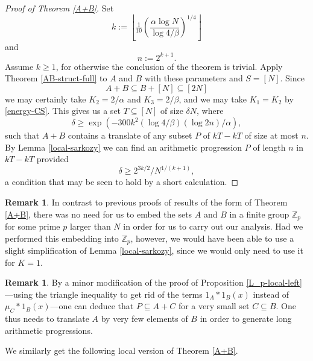 \documentclass[12pt,a4paper,reqno]{amsart}
\numberwithin{equation}{section}
\theoremstyle{plain}
\theoremstyle{definition}
\newtheorem{remark}[theorem]{Remark}
\renewcommand{\geq}{\geqslant}
\renewcommand{\subset}{\subseteq}
\def\Z{\mathbb{Z}}
\newcommand{\Zmod}[1]{\Z_#1} %
\begin{document}
\begin{proof}[Proof of Theorem \ref{A+B}]
Set 
\[ k := \left\lfloor \tfrac{1}{10} \left( \frac{\alpha \log{N}}{\log{4/\beta}} \right)^{1/4} \right\rfloor \]
and
\[ n := 2^{k+1}. \]
Assume $k \geq 1$, for otherwise the conclusion of the theorem is trivial. Apply Theorem \ref{AB-struct-full} to $A$ and $B$ with these parameters and $S = [N]$. Since 
\[ A+B \subset B + [N] \subset [2N] \]
we may certainly take $K_2 = 2/\alpha$ and $K_3 = 2/\beta$, and we may take $K_1 = K_2$ by \eqref{energy-CS}. This gives us a set $T \subset [N]$ of size $\delta N$, where
\[ \delta \geq \exp\left(-300 k^2 (\log{4/\beta}) (\log{2n}) /\alpha \right), \]
such that $A+B$ contains a translate of any subset $P$ of $kT-kT$ of size at most $n$. By Lemma \ref{local-sarkozy} we can find an arithmetic progression $P$ of length $n$ in $kT-kT$ provided 
\[ \delta \geq 2^{3k/2}/N^{1/(k+1)}, \]
a condition that may be seen to hold by a short calculation.
\end{proof}
\begin{remark}
In contrast to previous proofs of results of the form of Theorem \ref{A+B}, there was no need for us to embed the sets $A$ and $B$ in a finite group $\Zmod{p}$ for some prime $p$ larger than $N$ in order for us to carry out our analysis. Had we performed this embedding into $\Zmod{p}$, however, we would have been able to use a slight simplification of Lemma \ref{local-sarkozy}, since we would only need to use it for $K=1$.
\end{remark}
\begin{remark}
By a minor modification of the proof of Proposition \ref{L_p-local-left}---using the triangle inequality to get rid of the terms $1_A*1_B(x)$ instead of $\mu_C*1_B(x)$---one can deduce that $P \subset A+C$ for a very small set $C \subset B$. One thus needs to translate $A$ by very few elements of $B$ in order to generate long arithmetic progressions.
\end{remark}

We similarly get the following local version of Theorem \ref{A+B}.
\end{document}
